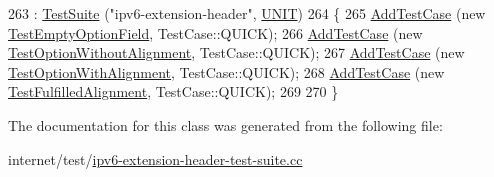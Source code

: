 \begin{DoxyCode}
263     : \hyperlink{classns3_1_1TestSuite_a904b0c40583b744d30908aeb94636d1a}{TestSuite} (\textcolor{stringliteral}{"ipv6-extension-header"}, \hyperlink{classns3_1_1TestSuite_a1ebfcab34ec8161e085e8e3a1855eae0a3885375a3787abf60431f8454b3cadbd}{UNIT})
264   \{
265     \hyperlink{classns3_1_1TestCase_a3718088e3eefd5d6454569d2e0ddd835}{AddTestCase} (\textcolor{keyword}{new} \hyperlink{classTestEmptyOptionField}{TestEmptyOptionField}, TestCase::QUICK);
266     \hyperlink{classns3_1_1TestCase_a3718088e3eefd5d6454569d2e0ddd835}{AddTestCase} (\textcolor{keyword}{new} \hyperlink{classTestOptionWithoutAlignment}{TestOptionWithoutAlignment}, TestCase::QUICK);
267     \hyperlink{classns3_1_1TestCase_a3718088e3eefd5d6454569d2e0ddd835}{AddTestCase} (\textcolor{keyword}{new} \hyperlink{classTestOptionWithAlignment}{TestOptionWithAlignment}, TestCase::QUICK);
268     \hyperlink{classns3_1_1TestCase_a3718088e3eefd5d6454569d2e0ddd835}{AddTestCase} (\textcolor{keyword}{new} \hyperlink{classTestFulfilledAlignment}{TestFulfilledAlignment}, TestCase::QUICK);
269 
270   \}
\end{DoxyCode}


The documentation for this class was generated from the following file\+:\begin{DoxyCompactItemize}
\item 
internet/test/\hyperlink{ipv6-extension-header-test-suite_8cc}{ipv6-\/extension-\/header-\/test-\/suite.\+cc}\end{DoxyCompactItemize}
